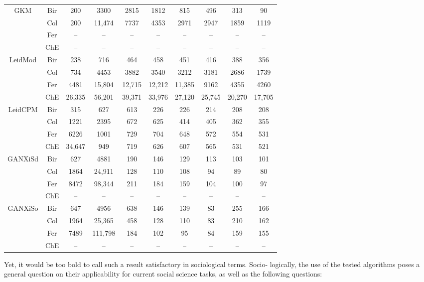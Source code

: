 \begin{table}[ht]
\begin{adjustbox}{width=1\textwidth}
\begin{tabular}{ c  c  c  c  c  c  c  c  c  c  }
			\multirow{4}{*}{GKM} & Bir & 200 & 3300 & 2815 & 1812 & 815 & 496 & 313 & 90 \\
			& Col & 200 & 11,474 & 7737 & 4353 & 2971 & 2947 & 1859 & 1119 \\
			& Fer & --& --& --& --& --& --& --& --\\
			& ChE & --& --& --& --& --& --& --& --\\
			\hline
			\multirow{4}{*}{LeidMod} & Bir & 238 & 716 & 464 & 458 & 451 & 416 & 388 & 356\\
			& Col & 734 & 4453 & 3882 & 3540 & 3212 & 3181 & 2686 & 1739\\
			& Fer & 4481 & 15,804 & 12,715 & 12,212 & 11,385 & 9162 & 4355 & 4260  \\
			& ChE & 26,335 & 56,201 & 39,371 & 33,976 & 27,120 & 25,745 & 20,270 & 17,705 \\
			\hline
			\multirow{4}{*}{LeidCPM} & Bir & 315 & 627 & 613 & 226 & 226 & 214 & 208 & 208 \\
			& Col & 1221 & 2395 & 672 & 625 & 414 & 405 & 362 & 355 \\
			& Fer & 6226 & 1001 & 729 & 704 & 648 & 572 & 554 & 531 \\
			& ChE & 34,647 & 949 & 719 & 626 & 607 & 565 & 531 & 521 \\
			\hline
			\multirow{4}{*}{GANXiSd} & Bir & 627 & 4881 & 190 & 146 & 129 & 113 & 103 & 101 \\
			& Col & 1864 & 24,911 & 128 & 110 & 108 & 94 & 89 & 80 \\
			& Fer & 8472 & 98,344 & 211 & 184 & 159 & 104 & 100 & 97 \\
			& ChE & --& --& --& --& --& --& --& --\\
			\hline
			\multirow{4}{*}{GANXiSo} & Bir & 647 & 4956 & 638 & 146 & 139 & 83 & 255 & 166 \\
			& Col & 1964 & 25,365 & 458 & 128 & 110 & 83 & 210 & 162 \\
			& Fer & 7489 & 111,798 & 184 & 102 & 95 & 84 & 159 & 155 \\
			& ChE & --& --& --& --& --& --& --& --\\
			\bottomrule
		\end{tabular}%
	\end{adjustbox}
\end{table}

Yet, it would be too bold to call such a result satisfactory in sociological terms. Socio- logically, the use of the tested algorithms poses a general question on their applicability for current social science tasks, as well as the following questions:

